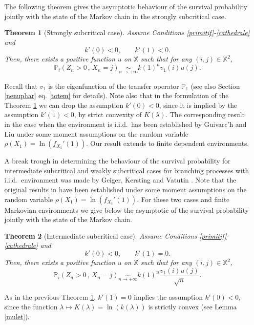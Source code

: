 \documentclass[12pt]{amsart}
\newtheorem{theorem}{Theorem}[section]
\theoremstyle{definition}
\numberwithin{equation}{section}
\def\bb#1{\mathbb{#1}}
\renewcommand\ll{\lambda}
\begin{document}
The following theorem gives the asymptotic behaviour of the survival probability jointly 
with the state of the Markov chain in the strongly subcritical case.   

\begin{theorem}[Strongly subcritical case]
\label{couronne}
Assume Conditions \ref{primitif}-\ref{cathedrale} and
\[
k'(0) < 0, \qquad k'(1) < 0.
\]
Then, there exists a positive function $u$ on $\bb X$ such that for any $(i,j) \in \bb X^2$,
\[
\bb P_i \left( Z_n > 0 \,,\, X_n = j \right) \underset{n \to +\infty}{\sim} k(1)^n v_1(i)u(j).
\]
\end{theorem}

Recall that $v_1$ is the eigenfunction of the transfer operator $\bb P_{1}$ 
(see also Section \ref{nenuphar} eq. \eqref{totem} for details).
Note also that in the formulation of the Theorem \ref{couronne} we can drop the assumption $k'(0) < 0$, 
since it is implied by the assumption $k'(1) < 0$, by strict convexity of $K(\ll)$. The corresponding result in the case when the environment is i.i.d.\ has been established by 
Guivarc'h and Liu \cite{guivarch_proprietes_2001} 
under some moment assumptions on the random variable
$\rho(X_1)=\ln \left( f_{X_1}'(1) \right)$. 
Our result extends \cite{guivarch_proprietes_2001} to finite dependent environments.

A break trough in determining the behaviour
of the survival probability for intermediate subcritical and weakly subcritical cases
for branching processes with i.i.d.\ environment was made by  
Geiger, Kersting and Vatutin \cite{geiger_limit_2003}.
Note that the original results in \cite{geiger_limit_2003}
have been established under some moment assumptions
on the random variable $\rho(X_1)=\ln \left( f_{X_1}'(1) \right)$. 
For these two cases and finite Markovian environments
 we give below the asymptotic of the survival probability jointly with
 the state of the Markov chain.

\begin{theorem}[Intermediate subcritical case]
\label{sceptre}
Assume Conditions \ref{primitif}-\ref{cathedrale} and
\[
k'(0) < 0, \qquad k'(1) = 0.
\]
Then, there exists a positive function $u$  on $\bb X$ such that for any $(i,j) \in \bb X^2$,
\[
\bb P_i \left(  Z_n > 0 \,,\, X_n = j \right) \underset{n \to +\infty}{\sim} k(1)^n \frac{v_1 (i) u(j)}{\sqrt{n}}.
\]
\end{theorem}

As in the previous Theorem \ref{couronne},  $k'(1) = 0$ implies the assumption $k'(0) < 0$, since the function 
$\ll \mapsto K(\ll) = \ln (k(\ll))$ is strictly convex (see Lemma \ref{mulet}).
\end{document}
